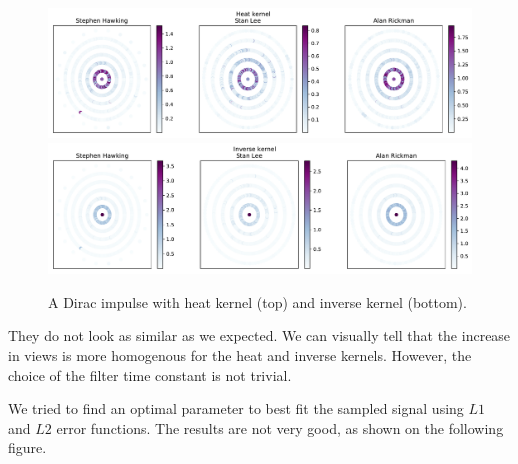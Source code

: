 \documentclass[conference]{IEEEtran}
\begin{document}
\begin{figure}[!htb]
\includegraphics[width=\linewidth]{heat_scatter.pdf}
\includegraphics[width=\linewidth]{inverse_scatter.pdf}
\caption{A Dirac impulse with heat kernel (top) and inverse kernel (bottom).} 
\end{figure}

They do not look as similar as we expected. We can visually tell that the increase in views is more homogenous for the heat and inverse kernels. However, the choice of the filter time constant is not trivial. 

\medskip

We tried to find an optimal parameter to best fit the sampled signal using $L1$ and $L2$ error functions. The results are not very good, as shown on the following figure. 
\end{document}
